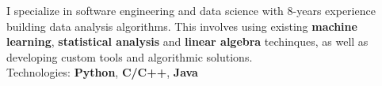 \begin{cventries}
    \begin{flushleft}
        \bodyfont
        I specialize in software engineering and data science with 8-years
        experience building data analysis algorithms. This
        involves using existing \textbf{machine learning},
        \textbf{statistical analysis} and \textbf{linear algebra} techinques, as well as
        developing custom tools and algorithmic solutions.\\
        Technologies: \textbf{Python}, \textbf{C/C++}, \textbf{Java}
    \end{flushleft}
\end{cventries}
